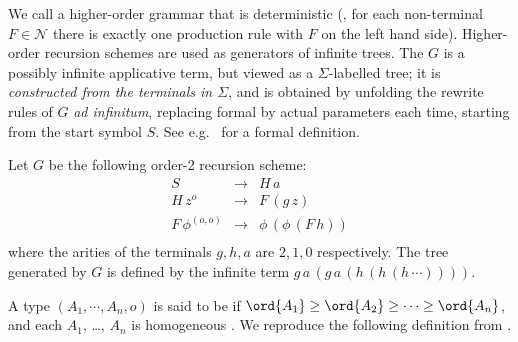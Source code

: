 We call  a higher-order
grammar that is deterministic (\ie, for each non-terminal $F \in
\mathcal{N}$ there is exactly one production rule with $F$ on the
left hand side). Higher-order recursion schemes are used as
generators of infinite trees. The  $G$ is a possibly infinite applicative term, but
viewed as a $\Sigma$-labelled tree; it is \emph{constructed from the
terminals in $\Sigma$}, and is obtained by unfolding the rewrite
rules of $G$ \emph{ad infinitum}, replacing formal by actual
parameters each time, starting from the start symbol $S$. See
e.g.~\cite{KNU02} for a formal definition.

\pssetcomptree
{}
\begin{example}\rm\label{eg:running}
  Let $G$ be the following order-2 recursion scheme:
\[\begin{array}{rll}
  S & \rightarrow & H \, a\\
  H \, z^o & \rightarrow & F \, (g \,
  z)\\
  F \, \phi^{(o, o)} & \rightarrow & \phi \, (\phi \, (F \, h))\\
\end{array}\]
where the arities of the terminals $g, h, a$ are $2, 1, 0$ respectively.
The tree generated by $G$ is defined by the infinite term $g \, a \, (g \, a \, (h \, (h \, (h \,
\cdots))))$.%

\end{example}

A type $(A_1, \cdots, A_n, o)$ is said to be  if
$\ord{A_1} \geq \ord{A_2}\geq \cdots \geq \ord{A_n}$, and each $A_1$,
\ldots, $A_n$ is homogeneous \cite{KNU02}.  We reproduce the following
definition from \cite{KNU02}.

